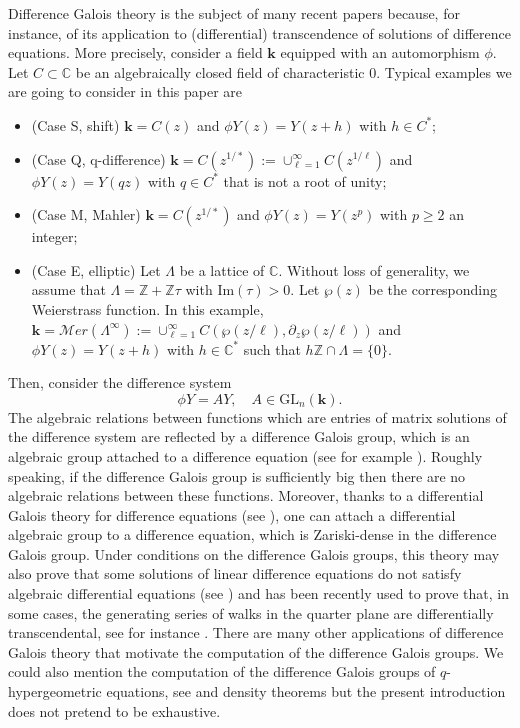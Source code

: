 \documentclass[a4paper,11pt]{amsart}
\newcommand{\GL}{\operatorname{GL}}
\def\k{\mathbf{k}}
\def\GL{\mathrm{GL}}
\def\Z{\mathbb{Z}}
\def\C{\mathbb{C}}
\begin{document}
Difference Galois theory is the subject of many recent papers because, for instance, of its application to (differential) transcendence of solutions of difference equations. More precisely, consider a field $\mathbf{k}$ equipped with an automorphism $\phi$. Let $C\subset \C$ be an algebraically closed field of characteristic $0$.  Typical examples we are going to consider in this paper are 
\begin{itemize}
\item (Case S, shift)  $\k=C(z)$ and $\phi Y(z)=Y(z+h)$  with $h\in C^{*}$;
\item  (Case Q, q-difference) $\k=C\left(z^{1/*}\right):=\displaystyle \cup_{\ell=1}^{\infty}C(z^{1/\ell})$   and 
$\phi Y(z)=Y(qz)$  with $q\in C^{*}$ that is not a root of unity;
\item (Case M, Mahler) $\k=C\left(z^{1/*}\right)$  and 
$\phi Y(z)=Y(z^{p})$  with $p\ge 2$ an integer;
\item (Case E, elliptic) Let $\Lambda$ be a lattice of $\C$. Without loss of generality, we assume that $\Lambda = \Z + \Z\tau$ with $\mbox{Im}(\tau)>0$. Let $\wp(z)$ be the corresponding Weierstrass function. In this example, $\k=\mathcal{M}er (\Lambda^{\infty}):=\displaystyle \cup_{\ell=1}^{\infty}C(\wp(z/\ell),\partial_{z}\wp(z/\ell))$ 
 and  $\phi Y(z)=Y(z+h)$  with $h\in \C^{*}$ such that  $h\Z\cap \Lambda= \{0\}$.
\end{itemize}
Then, consider the difference system 
$$\phi Y=AY, \quad A\in \GL_n(\mathbf{k}).$$
The algebraic relations between functions which are entries of matrix solutions of the difference system are reflected by a difference Galois group, which is an algebraic group attached to a difference equation (see for example \cite{van2006galois,Phi15}). Roughly speaking, if the difference Galois group is sufficiently big then there are no algebraic relations between these functions. Moreover, thanks to a differential Galois theory for difference equations (see \cite{HS08}), one can attach a differential algebraic group to a difference equation, which is Zariski-dense in the difference Galois group. Under  conditions on the difference Galois groups, this theory may also prove that some solutions of linear difference equations do not satisfy algebraic differential equations  (see \cite{HS08,arreche2017galois,dreyfus2018hypertranscendence,
adamczewski2020algebraic,adamczewski2021hypertranscendence,
arreche2021differential,dreyfus2021functional}) and has been recently used to prove that, in some cases, the generating series of walks in the quarter plane are differentially transcendental, see for instance \cite{dreyfus2018nature}.  There are many other applications of difference Galois theory that motivate the computation of the difference Galois groups. We could also mention the computation of the difference Galois groups of $q$-hypergeometric equations,  see \cite{roques2011generalized}  and density theorems \cite{ramis2006q, poulet2020density} but the present introduction does not pretend to be exhaustive.
\end{document}
